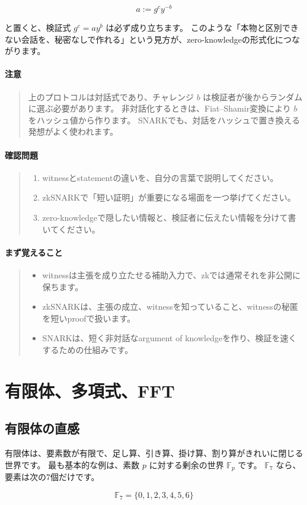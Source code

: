\documentclass[a4paper,11pt]{ltjsarticle}
\newcommand{\F}{\mathbb{F}}
\newenvironment{keybox}{%
  \paragraph*{まず覚えること}\begin{quote}
}{%
  \end{quote}
}
\newenvironment{warnbox}{%
  \paragraph*{注意}\begin{quote}
}{%
  \end{quote}
}
\newenvironment{checkpointbox}{%
  \paragraph*{確認問題}\begin{quote}
}{%
  \end{quote}
}
\begin{document}
\[
  a:=g^c y^{-b}
\]

と置くと、検証式 \(g^c=ay^b\) は必ず成り立ちます。
このような「本物と区別できない会話を、秘密なしで作れる」という見方が、zero-knowledgeの形式化につながります。

\begin{warnbox}
上のプロトコルは対話式であり、チャレンジ \(b\) は検証者が後からランダムに選ぶ必要があります。
非対話化するときは、Fiat--Shamir変換により \(b\) をハッシュ値から作ります。
SNARKでも、対話をハッシュで置き換える発想がよく使われます。
\end{warnbox}

\begin{checkpointbox}
\begin{enumerate}
  \item witnessとstatementの違いを、自分の言葉で説明してください。
  \item zkSNARKで「短い証明」が重要になる場面を一つ挙げてください。
  \item zero-knowledgeで隠したい情報と、検証者に伝えたい情報を分けて書いてください。
\end{enumerate}
\end{checkpointbox}

\begin{keybox}
\begin{itemize}
  \item witnessは主張を成り立たせる補助入力で、zkでは通常それを非公開に保ちます。
  \item zkSNARKは、主張の成立、witnessを知っていること、witnessの秘匿を短いproofで扱います。
  \item SNARKは、短く非対話なargument of knowledgeを作り、検証を速くするための仕組みです。
\end{itemize}
\end{keybox}

\section{有限体、多項式、FFT}

\subsection{有限体の直感}

有限体は、要素数が有限で、足し算、引き算、掛け算、割り算がきれいに閉じる世界です。
最も基本的な例は、素数 \(p\) に対する剰余の世界 \(\F_p\) です。
\(\F_7\) なら、要素は次の7個だけです。

\[
  \F_7 = \{0,1,2,3,4,5,6\}
\]
\end{document}
